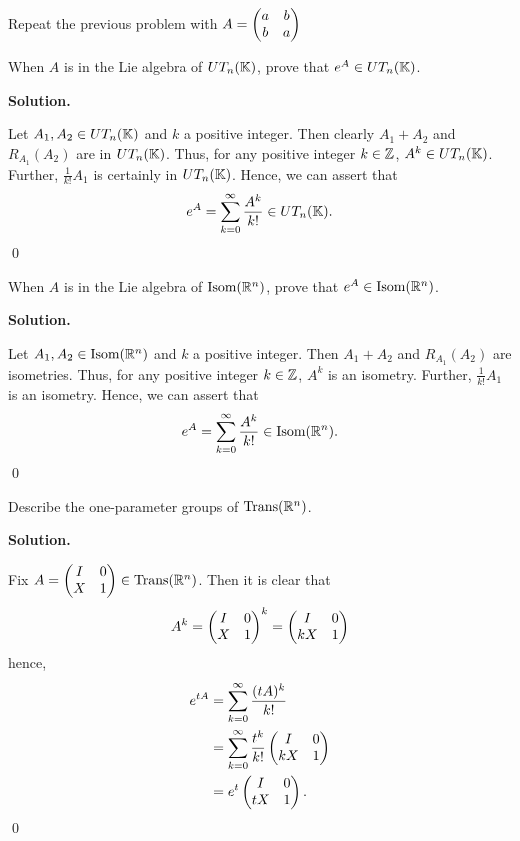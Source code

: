 \documentclass[12pt]{book}
\theoremstyle{definition}
\newenvironment{solution}
{%
  \par\noindent\textbf{Solution.}\quad
}
{%
  \qed\par
}
\begin{document}
\begin{taggedexercise}[\textcolor{red}{TODO}]
  Repeat the previous problem with $A = \begin{pmatrix} a & b \\ b & a \end{pmatrix}$
\end{taggedexercise}

\begin{taggedexercise}[\textcolor{green}{Complete}]
  When $A$ is in the Lie algebra of $UT_n(\mathbb{K})$, prove that $e^A \in UT_n(\mathbb{K})$.
\end{taggedexercise}

\begin{solution}
  Let $A_1, A_2 \in UT_n(\mathbb{K})$ and $k$ a positive integer.
  Then clearly $A_1 + A_2$ and $R_{A_1}(A_2)$ are in $UT_n(\mathbb{K})$.
  Thus, for any positive integer $k \in \mathbb{Z}$, $A^k \in UT_n(\mathbb{K})$.
  Further, $\frac{1}{k!}A_1$ is certainly in $UT_n(\mathbb{K})$.
  Hence, we can assert that 
  \[
  e^A = \sum_{k=0}^\infty \frac{A^k}{k!} \in UT_n(\mathbb{K}).
  \]
\end{solution}


\begin{taggedexercise}[\textcolor{green}{Complete}]
  When $A$ is in the Lie algebra of $\text{Isom}(\mathbb{R}^n)$, prove that $e^A \in \text{Isom}(\mathbb{R}^n)$.
\end{taggedexercise}

\begin{solution}
  Let $A_1, A_2 \in \text{Isom}(\mathbb{R}^n)$ and $k$ a positive integer.
  Then $A_1 + A_2$ and $R_{A_1}(A_2)$ are isometries.
  Thus, for any positive integer $k \in \mathbb{Z}$, $A^k$ is an isometry.
  Further, $\frac{1}{k!}A_1$ is an isometry.
  Hence, we can assert that 
  \[
  e^A = \sum_{k=0}^\infty \frac{A^k}{k!} \in \text{Isom}(\mathbb{R}^n).
  \]
\end{solution}


\begin{taggedexercise}[\textcolor{green}{Complete}]
  Describe the one-parameter groups of $\text{Trans}(\mathbb{R}^n)$.
\end{taggedexercise}

\begin{solution}
  Fix $A = \begin{pmatrix} I & 0 \\ X & 1 \end{pmatrix} \in \text{Trans}(\mathbb{R}^n)$.
  Then it is clear that 
  \[A^k = \begin{pmatrix} I & 0 \\ X & 1 \end{pmatrix}^k = \begin{pmatrix} I & 0 \\ kX & 1 \end{pmatrix}\]
  hence,
  \[\begin{aligned}
    e^{tA} &= \sum_{k=0}^\infty \frac{(tA)^k}{k!} \\
        &= \sum_{k=0}^\infty \frac{t^k}{k!}\begin{pmatrix} I & 0 \\ kX & 1 \end{pmatrix} \\
        &= e^t\begin{pmatrix} I & 0 \\ tX & 1 \end{pmatrix}.
  \end{aligned}\]
\end{solution}
\end{document}

